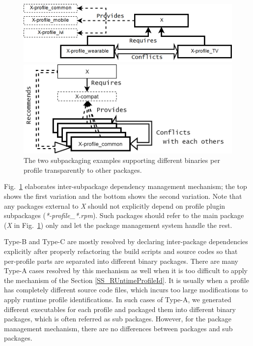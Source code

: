 \begin{figure}
\centering
\includegraphics[width=0.98\columnwidth]{figures/Dependency_nonmeta_X.png}
  
\vspace{0.2cm}
  
\includegraphics[width=0.98\columnwidth]{figures/Dependency_metaX.png}
\caption{The two subpackaging examples supporting different binaries per profile transparently to other packages.}
\label{FIG_TZN_TYPEB_RESOL}
\end{figure}

Fig.~\ref{FIG_TZN_TYPEB_RESOL} elaborates inter-subpackage dependency management mechanism; the top shows the first variation and the bottom shows the second variation.
Note that any packages external to \textit{X} should not explicitly depend on profile plugin subpackages (\textit{*-profile\_*.rpm}).
Such packages should refer to the main package (\textit{X} in Fig.~\ref{FIG_TZN_TYPEB_RESOL}) only and let the package management system handle the rest.


Type-B and Type-C are mostly resolved by declaring inter-package dependencies explicitly after properly refactoring the build scripts and source codes so that per-profile parts are separated into different binary packages.
There are many Type-A cases resolved by this mechanism as well when it is too difficult to apply the mechanism of the Section \ref{SS_RUntimeProfileId}.
It is usually when a profile has completely different source code files, which incurs too large modifications to apply runtime profile identifications.
In such cases of Type-A, we generated different executables for each profile and packaged them into different binary packages, which is often referred as sub packages.
However, for the package management mechanism, there are no differences between packages and sub packages.


